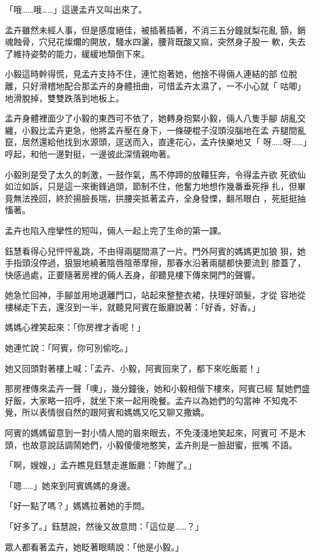 「哦……哦……」這邊孟卉又叫出來了。

孟卉雖然未經人事，但是感度絕佳，被插著插著，不消三五分鐘就梨花亂
顫，銷魂蝕骨，穴兒花燦爛的開放，騷水四灑，腰背既酸又痲，突然身子股一
軟，失去了維持姿勢的能力，緩緩地頹倒下來。

小毅這時幹得慌，見孟卉支持不住，連忙抱著她，他捨不得倆人連結的部
位脫離，只好滑稽地配合那孟卉的身體扭曲，可惜孟卉太濕了，一不小心就「
咕唧」地滑脫掉，雙雙跌落到地板上。

孟卉身體裡面少了小毅的東西可不依了，她轉身抱緊小毅，倆人八隻手腳
胡亂交纏，小毅比孟卉更急，他將孟卉壓在身下，一條硬棍子沒頭沒腦地在孟
卉腿間亂竄，居然還給他找到水源頭，逕送而入，直達花心，孟卉快樂地又「
呀……呀……」哼起，和他一邊對挺，一邊彼此深情親吻著。

小毅則是受了太久的刺激，一鼓作氣，馬不停蹄的放韁狂奔，令得孟卉欲
死欲仙如泣如訴，只是這一來衝鋒過頭，節制不住，他奮力地想作幾番垂死掙
扎，但畢竟無法挽回，終於揚臉長喘，拱腰突抵著孟卉，全身發慄，翻吊眼白
，死挺挺抽慉著。

孟卉也陷入痙攣性的短叫，倆人一起上完了生命的第一課。

鈺慧看得心兒怦怦亂跳，不由得兩腿間濕了一片。門外阿賓的媽媽更加狼
狽，她手指頭沒停過，狠狠地繞著陰唇陰蒂摩擦，那春水沿著兩腿都快要流到
膝蓋了，快感過處，正要隨著房裡的倆人丟身，卻聽見樓下傳來開門的聲響。

她急忙回神，手腳並用地退離門口，站起來整整衣裙，扶理好頭髮，才從
容地從樓梯走下去，還沒到一半，就聽見阿賓在飯廳說著：「好香，好香。」

媽媽心裡笑起來：「你房裡才香呢！」

她連忙說：「阿賓，你可別偷吃。」

她又回頭對著樓上喊：「孟卉、小毅，阿賓回來了，都下來吃飯罷！」

那房裡傳來孟卉一聲「噢」，幾分鐘後，她和小毅相偕下樓來，阿賓已經
幫她們盛好飯，大家略一招呼，就坐下來一起用晚餐。孟卉以為她們的勾當神
不知鬼不覺，所以表情很自然的跟阿賓和媽媽又吃又聊又撒嬌。

阿賓的媽媽留意到一對小情人間的眉來眼去，不免淺淺地笑起來，阿賓可
不是木頭，也故意說話調鬧她們，小毅傻傻地憨笑，孟卉則是一臉甜蜜，抿嘴
不語。

「啊，嫂嫂，」孟卉瞧見鈺慧走進飯廳：「妳醒了。」

「嗯……」她來到阿賓媽媽的身邊。

「好一點了嗎？」媽媽拉著她的手問。

「好多了。」鈺慧說，然後又故意問：「這位是……？」

眾人都看著孟卉，她眨著眼睛說：「他是小毅。」


